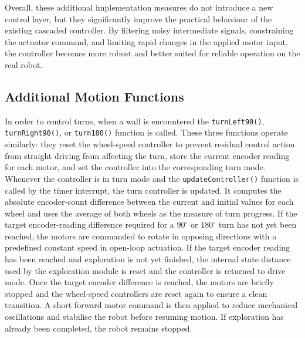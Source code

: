 Overall, these additional implementation measures do not introduce a new control layer, but they significantly improve the practical behaviour of the existing cascaded controller. By filtering noisy intermediate signals, constraining the actuator command, and limiting rapid changes in the applied motor input, the controller becomes more robust and better suited for reliable operation on the real robot.

\subsection{Additional Motion Functions}

In order to control turns, when a wall is encountered the \texttt{turnLeft90()}, \texttt{turnRight90()}, or \texttt{turn180()} function is called. These three functions operate similarly: they reset the wheel-speed controller to prevent residual control action from straight driving from affecting the turn, store the current encoder reading for each motor, and set the controller into the corresponding turn mode. Whenever the controller is in turn mode and the \texttt{updateController()} function is called by the timer interrupt, the turn controller is updated. It computes the absolute encoder-count difference between the current and initial values for each wheel and uses the average of both wheels as the measure of turn progress. If the target encoder-reading difference required for a $90^\circ$ or $180^\circ$ turn has not yet been reached, the motors are commanded to rotate in opposing directions with a predefined constant speed in open-loop actuation. If the target encoder reading has been reached and exploration is not yet finished, the internal state distance used by the exploration module is reset and the controller is returned to drive mode.
Once the target encoder difference is reached, the motors are briefly stopped and the wheel-speed controllers are reset again to ensure a clean transition. A short forward motor command is then applied to reduce mechanical oscillations and stabilise the robot before resuming motion. If exploration has already been completed, the robot remains stopped.
